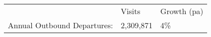 \begin{tabular}[t]{p{4.8cm}>{\hfill}p{1.3cm}>{\hfill}p{1.4cm}}
   & Visits & Growth (pa) \\ 
 Annual Outbound Departures: & 2,309,871 & 4\% \\ 
  \end{tabular}
